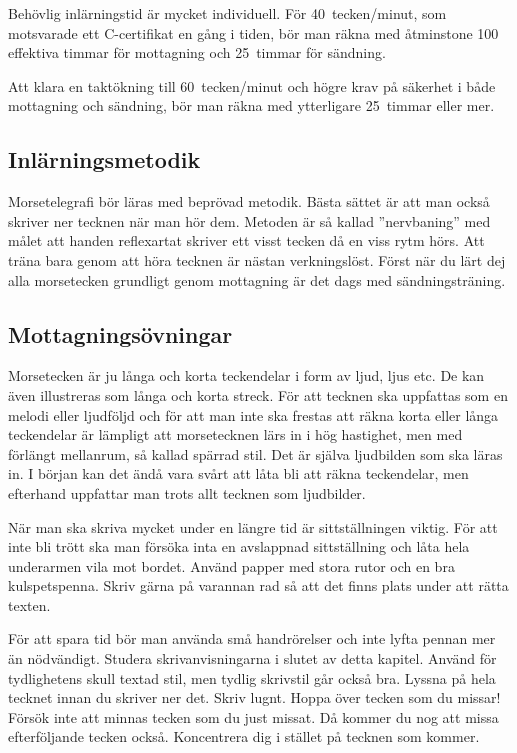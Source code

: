 Behövlig inlärningstid är mycket individuell.
För 40~tecken/minut, som motsvarade ett C-certifikat en gång i tiden, bör man
räkna med åtminstone 100 effektiva timmar för mottagning och 25~timmar för
sändning.

Att klara en taktökning till 60~tecken/minut och högre krav på säkerhet i både
mottagning och sändning, bör man räkna med ytterligare 25~timmar eller mer.

\subsection{Inlärningsmetodik}

Morsetelegrafi bör läras med beprövad metodik.
Bästa sättet är att man också skriver ner tecknen när man hör dem.
Metoden är så kallad ''nervbaning'' med målet att handen reflexartat skriver
ett visst tecken då en viss rytm hörs.
Att träna bara genom att höra tecknen är nästan verkningslöst.
Först när du lärt dej alla morsetecken grundligt genom mottagning är det dags
med sändningsträning.

\subsection{Mottagnings\-övningar}

Morsetecken är ju långa och korta teckendelar i form av ljud, ljus etc.
De kan även illustreras som långa och korta streck.
För att tecknen ska uppfattas som en melodi eller ljudföljd och för att man
inte ska frestas att räkna korta eller långa teckendelar är lämpligt att
morsetecknen lärs in i hög hastighet, men med förlängt mellanrum, så kallad
spärrad stil.
Det är själva ljudbilden som ska läras in.
I början kan det ändå vara svårt att låta bli att räkna teckendelar, men
efterhand uppfattar man trots allt tecknen som ljudbilder.

När man ska skriva mycket under en längre tid är sittställningen viktig.
För att inte bli trött ska man försöka inta en avslappnad sittställning och låta
hela underarmen vila mot bordet.
Använd papper med stora rutor och en bra kulspetspenna.
Skriv gärna på varannan rad så att det finns plats under att rätta texten.

För att spara tid bör man använda små handrörelser och inte lyfta pennan mer än
nödvändigt.
Studera skrivanvisningarna i slutet av detta kapitel.
Använd för tydlighetens skull textad stil, men tydlig skrivstil går också bra.
Lyssna på hela tecknet innan du skriver ner det.
Skriv lugnt.
Hoppa över tecken som du missar!
Försök inte att minnas tecken som du just missat.
Då kommer du nog att missa efterföljande tecken också.
Koncentrera dig i stället på tecknen som kommer.

